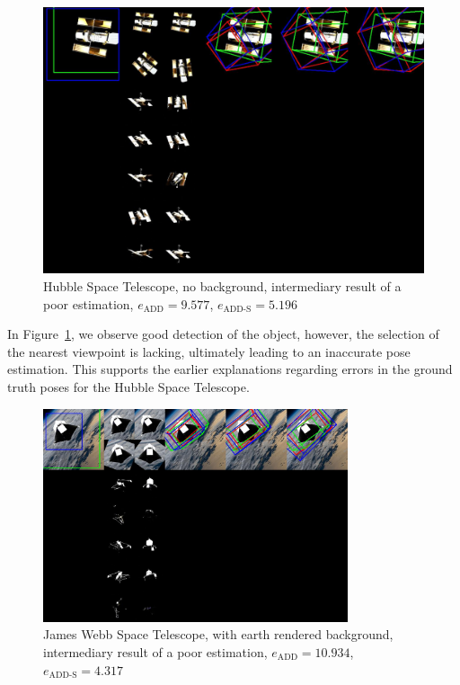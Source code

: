 \bigskip

\begin{figure}[ht]
  \centering
  \includegraphics[width=\textwidth]{data/fig11.jpg}
  \caption{Hubble Space Telescope, no background, intermediary result of a poor estimation, $e_\mathrm{ADD}=9.577$, $e_{\mathrm{ADD}\text{-}\mathrm{S}}=5.196$}
  \label{fig:fig11}
\end{figure}

In Figure~\ref{fig:fig11}, we observe good detection of the object, however, the selection of the nearest viewpoint is lacking, ultimately leading to an inaccurate pose estimation. This supports the earlier explanations regarding errors in the ground truth poses for the Hubble Space Telescope. 

\bigskip
\cleardoublepage{}

\begin{figure}[ht]
  \centering
  \includegraphics[width=0.8\textwidth]{data/fig12.jpg}
  \caption{James Webb Space Telescope, with earth rendered background, intermediary result of a poor estimation, $e_\mathrm{ADD}=10.934$, $e_{\mathrm{ADD}\text{-}\mathrm{S}}=4.317$}
  \label{fig:fig12}
\end{figure}

